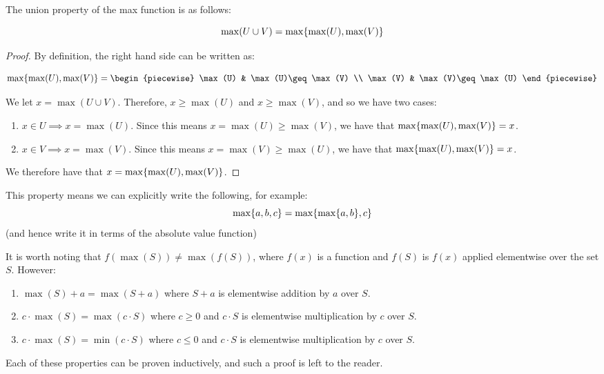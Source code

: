 \begin{theorem}
    The union property of the max function is as follows:

    $$
        \max(U\cup V)=\max\{\max(U),\max(V)\}
    $$

    \begin{proof}
        \label{proof:max}
        By definition, the right hand side can be written as:

        $$
            \max\br{\max(U),\max(V)}=\begin{piecewise}
                \max(U) & \max(U)\geq \max(V) \\
                \max(V) & \max(V)\geq \max(U)
            \end{piecewise}
        $$

        We let $x=\max(U\cup V)$. Therefore, $x\geq\max(U)$ and $x\geq\max(V)$, and so we have two cases:

        \begin{enumerate}
            \item $x\in U\implies x=\max(U)$. Since this means $x=\max(U)\geq\max(V)$, we have that $\max\{\max(U),\max(V)\}=x$.
            \item $x\in V\implies x=\max(V)$. Since this means $x=\max(V)\geq\max(U)$, we have that $\max\{\max(U),\max(V)\}=x$.
        \end{enumerate}

        We therefore have that $x=\max\{\max(U),\max(V)\}$.
    \end{proof}

    This property means we can explicitly write the following, for example:
    $$
        \max\{a,b,c\}=\max\{\max\{a,b\},c\}
    $$
    (and hence write it in terms of the absolute value function)
\end{theorem}

\begin{theorem}
    It is worth noting that $f(\max(S))\neq \max(f(S))$, where $f(x)$ is a function and $f(S)$ is $f(x)$ applied elementwise over the set $S$. However:

    \begin{enumerate}
        \item $\max(S)+a=\max(S+a)$ where $S+a$ is elementwise addition by $a$ over $S$.
        \item $c\cdot\max(S)=\max(c\cdot S)$ where $c\geq 0$ and $c\cdot S$ is elementwise multiplication by $c$ over $S$.
        \item $c\cdot\max(S)=\min(c\cdot S)$ where $c\leq 0$ and $c\cdot S$ is elementwise multiplication by $c$ over $S$.
    \end{enumerate}

    Each of these properties can be proven inductively, and such a proof is left to the reader.
\end{theorem}


